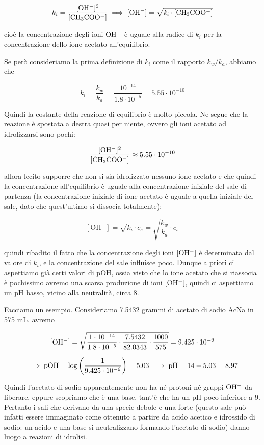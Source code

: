 $$k_i = \rm{\frac{[OH^-]^2}{[CH_3COO^-]}} \implies [OH^-]= \sqrt{\textit{k}_\textit{i} \cdot [CH_3COO^-]}$$

cioè la concentrazione degli ioni $\rm OH^-$ è uguale alla radice di $k_i$ per la concentrazione dello ione acetato all'equilibrio.

Se però consideriamo la prima definizione di $k_i$ come il rapporto $k_w/k_a$, abbiamo che

$$k_i = \frac{k_w}{k_a} = \frac{10^{-14}}{1.8 \cdot 10^{-5}}=5.55 \cdot 10^{-10}$$

Quindi la costante della reazione di equilibrio è molto piccola. Ne segue che la reazione è spostata a destra quasi per niente, ovvero gli ioni acetato ad idrolizzarsi sono pochi:

$$\rm{\frac{[OH^-]^2}{[CH_3COO^-]}} \approx 5.55 \cdot 10^{-10}$$

\E allora lecito supporre che non si sia idrolizzato nessuno ione acetato e che quindi la concentrazione all'equilibrio è uguale alla concentrazione iniziale del sale di partenza (la concentrazione iniziale di ione acetato è uguale a quella iniziale del sale, dato che quest'ultimo si dissocia totalmente):

$$[\text{OH}^-]=\sqrt{k_i \cdot c_s}=\sqrt{\frac{k_w}{k_a}\cdot c_s}$$

\E quindi ribadito il fatto che la concentrazione degli ioni $\rm [OH^-]$ è determinata dal valore di $k_i$, e la concentrazione del sale influisce poco. Dunque a priori ci aspettiamo già certi valori di pOH, ossia visto che lo ione acetato che si riassocia è pochissimo avremo una scarsa produzione di ioni $\rm [OH^-]$, quindi ci aspettiamo un pH basso, vicino alla neutralità, circa 8.

Facciamo un esempio. Consideriamo 7.5432 grammi di acetato di sodio AcNa in 575 mL. avremo

$$\rm [OH^-]=\sqrt{\frac{1 \cdot 10^{-14}}{1.8 \cdot 10^{-5}}\cdot \frac{7.5432}{82.0343} \cdot \frac{1000}{575}}=9.425 \cdot 10^{-6}$$

$$\implies \rm pOH = \log \left( \frac{1}{9.425 \cdot 10^{-6}} \right)=5.03 \implies pH= 14-5.03=8.97$$

Quindi l'acetato di sodio apparentemente non ha né protoni né gruppi $\rm OH^-$ da liberare, eppure scopriamo che è una base, tant'è che ha un pH poco inferiore a 9. Pertanto i sali che derivano da una specie debole e una forte (questo sale può infatti essere immaginato come ottenuto a partire da acido acetico e idrossido di sodio: un acido e una base si neutralizzano formando l'acetato di sodio) danno luogo a reazioni di idrolisi.

